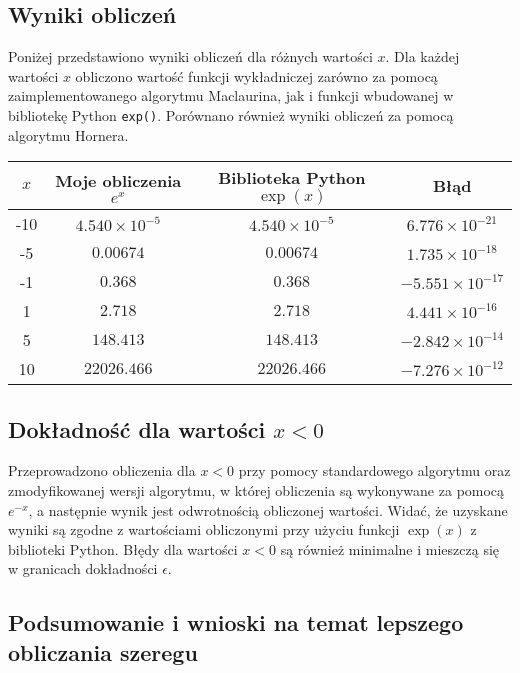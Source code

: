 \documentclass{article}
\begin{document}
\subsection{Wyniki obliczeń}

Poniżej przedstawiono wyniki obliczeń dla różnych wartości $x$. Dla każdej wartości $x$ obliczono wartość funkcji wykładniczej zarówno za pomocą zaimplementowanego algorytmu Maclaurina, jak i funkcji wbudowanej w bibliotekę Python \texttt{exp()}. Porównano również wyniki obliczeń za pomocą algorytmu Hornera.

\begin{center}
\begin{tabular}{|c|c|c|c|}
    \hline
    $x$ & Moje obliczenia $e^x$ & Biblioteka Python $\exp(x)$ & Błąd \\
    \hline
    -10 & $4.540\times10^{-5}$ & $4.540\times10^{-5}$ & $6.776\times10^{-21}$ \\
    -5  & $0.00674$ & $0.00674$ & $1.735\times10^{-18}$ \\
    -1  & $0.368$ & $0.368$ & $-5.551\times10^{-17}$ \\
    1   & $2.718$ & $2.718$ & $4.441\times10^{-16}$ \\
    5   & $148.413$ & $148.413$ & $-2.842\times10^{-14}$ \\
    10  & $22026.466$ & $22026.466$ & $-7.276\times10^{-12}$ \\
    \hline
\end{tabular}
\end{center}


\subsection{Dokładność dla wartości $x < 0$}

Przeprowadzono obliczenia dla $x < 0$ przy pomocy standardowego algorytmu oraz zmodyfikowanej wersji algorytmu, w której obliczenia są wykonywane za pomocą $e^{-x}$, a następnie wynik jest odwrotnością obliczonej wartości. Widać, że uzyskane wyniki są zgodne z wartościami obliczonymi przy użyciu funkcji $\exp(x)$ z biblioteki Python. Błędy dla wartości $x < 0$ są również minimalne i mieszczą się w granicach dokładności $\epsilon$.

\subsection{Podsumowanie i wnioski na temat lepszego obliczania szeregu}
\end{document}
